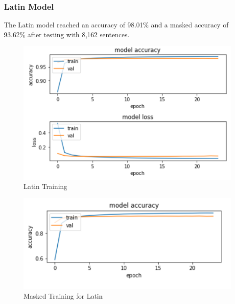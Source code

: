 \documentclass[conference]{IEEEtran}
\begin{document}
\subsubsection{Latin Model}
The Latin model reached an accuracy of 98.01\% and a masked accuracy of 93.62\% after testing with 8,162 sentences. 

\begin{figure}[htbp]
\centerline{\includegraphics[width=\linewidth]{latinTraining.PNG}}
\caption{Latin Training}
\label{fig7}
\end{figure}

\begin{figure}[htbp]
\centerline{\includegraphics[width=\linewidth]{latinmasked.PNG}}
\caption{Masked Training for Latin}
\label{fig8}
\end{figure}
\end{document}
